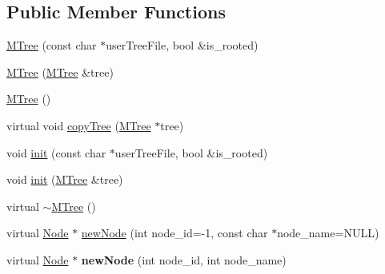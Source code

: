 \subsection*{Public Member Functions}
\begin{DoxyCompactItemize}
\item 
\hyperlink{classMTree_ac3f7f958f638616e0728cb8e2b865922}{MTree} (const char $\ast$userTreeFile, bool \&is\_\-rooted)
\item 
\hyperlink{classMTree_aa5d236fb4f1f1fbead1d167675c236c6}{MTree} (\hyperlink{classMTree}{MTree} \&tree)
\item 
\hyperlink{classMTree_aa6a5b154429fee7f9507f8fadce1fe95}{MTree} ()
\item 
virtual void \hyperlink{classMTree_ae1f6543f83abd7236065218131d7ea4b}{copyTree} (\hyperlink{classMTree}{MTree} $\ast$tree)
\item 
void \hyperlink{classMTree_a055e39797764c95c56dadd039eb4d00e}{init} (const char $\ast$userTreeFile, bool \&is\_\-rooted)
\item 
void \hyperlink{classMTree_ad7da0ad44a31e8e98262bd7ad0f494ab}{init} (\hyperlink{classMTree}{MTree} \&tree)
\item 
virtual \hyperlink{classMTree_ab56a0aa9ff7ee51f3b2352a0e80ca973}{$\sim$MTree} ()
\item 
virtual \hyperlink{classNode}{Node} $\ast$ \hyperlink{classMTree_a5e9560ad6b544027bea362387eb2ec3f}{newNode} (int node\_\-id=-\/1, const char $\ast$node\_\-name=NULL)
\item 
\hypertarget{classMTree_a8f1151b6e6d42903b7d02084c8deee43}{
virtual \hyperlink{classNode}{Node} $\ast$ {\bfseries newNode} (int node\_\-id, int node\_\-name)}
\label{classMTree_a8f1151b6e6d42903b7d02084c8deee43}


\end{DoxyCompactItemize}
